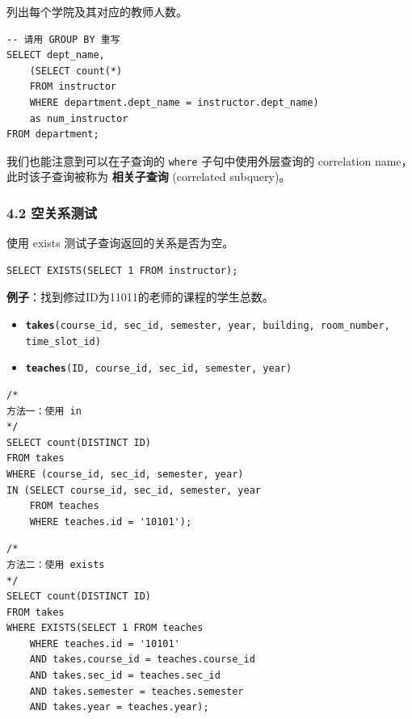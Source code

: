 \documentclass[aspectratio=169, 14pt]{beamer}
\begin{document}
\begin{frame}[fragile]
	列出每个学院及其对应的教师人数。

	\begin{verbatim}
-- 请用 GROUP BY 重写
SELECT dept_name,
    (SELECT count(*)
    FROM instructor
    WHERE department.dept_name = instructor.dept_name)
    as num_instructor
FROM department;
 \end{verbatim}

	我们也能注意到可以在子查询的 \texttt{where} 子句中使用外层查询的 \alert{correlation name}，此时该子查询被称为 \textbf{相关子查询} (correlated subquery)。

\end{frame}

\begin{frame}[fragile]
	\frametitle{4.2 空关系测试}
	使用 \alert{exists} 测试子查询返回的关系是否为空。

	\begin{verbatim}
SELECT EXISTS(SELECT 1 FROM instructor);
\end{verbatim}

	\pause
	\textbf{例子}：找到修过ID为11011的老师的课程的学生总数。
	\begin{itemize}
		\item \texttt{\textbf{takes}(course\_id, sec\_id, semester, year, building, room\_number, time\_slot\_id)}
		\item \texttt{\textbf{teaches}(ID, course\_id, sec\_id, semester, year)}
	\end{itemize}
\end{frame}

\begin{frame}[fragile]

	\begin{verbatim}
/*
方法一：使用 in
*/
SELECT count(DISTINCT ID)
FROM takes
WHERE (course_id, sec_id, semester, year)
IN (SELECT course_id, sec_id, semester, year
    FROM teaches
    WHERE teaches.id = '10101');    
\end{verbatim}
\end{frame}

\begin{frame}[fragile]
	\begin{verbatim}
/*
方法二：使用 exists
*/
SELECT count(DISTINCT ID)
FROM takes
WHERE EXISTS(SELECT 1 FROM teaches
    WHERE teaches.id = '10101'
    AND takes.course_id = teaches.course_id
    AND takes.sec_id = teaches.sec_id
    AND takes.semester = teaches.semester
    AND takes.year = teaches.year);
    \end{verbatim}

\end{frame}
\end{document}
